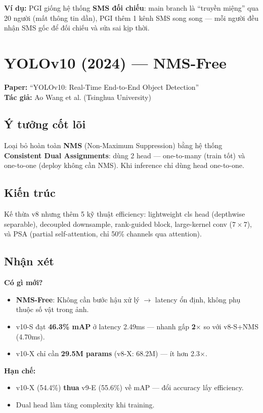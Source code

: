 \documentclass[12pt,a4paper]{report}
\begin{document}
\textbf{Ví dụ:} PGI giống hệ thống \textbf{SMS đối chiếu}: main branch là ``truyền miệng'' qua 20 người (mất thông tin dần), PGI thêm 1 kênh SMS song song --- mỗi người đều nhận SMS gốc để đối chiếu và sửa sai kịp thời.

\section{YOLOv10 (2024) --- NMS-Free}
\textbf{Paper:} ``YOLOv10: Real-Time End-to-End Object Detection''\\
\textbf{Tác giả:} Ao Wang et al. (Tsinghua University)

\subsection{Ý tưởng cốt lõi}
Loại bỏ hoàn toàn \textbf{NMS} (Non-Maximum Suppression) bằng hệ thống \textbf{Consistent Dual Assignments}: dùng 2 head --- one-to-many (train tốt) và one-to-one (deploy không cần NMS). Khi inference chỉ dùng head one-to-one.

\subsection{Kiến trúc}
Kế thừa v8 nhưng thêm 5 kỹ thuật efficiency: lightweight cls head (depthwise separable), decoupled downsample, rank-guided block, large-kernel conv ($7\times7$), và PSA (partial self-attention, chỉ 50\% channels qua attention).

\subsection{Nhận xét}

\textbf{Có gì mới?}
\begin{itemize}
    \item \textbf{NMS-Free}: Không cần bước hậu xử lý $\rightarrow$ latency ổn định, không phụ thuộc số vật trong ảnh.
    \item v10-S đạt \textbf{46.3\% mAP} ở latency 2.49ms --- nhanh gấp \textbf{2$\times$} so với v8-S+NMS (4.70ms).
    \item v10-X chỉ cần \textbf{29.5M params} (v8-X: 68.2M) --- ít hơn 2.3$\times$.
\end{itemize}

\textbf{Hạn chế:}
\begin{itemize}
    \item v10-X (54.4\%) \textbf{thua} v9-E (55.6\%) về mAP --- đổi accuracy lấy efficiency.
    \item Dual head làm tăng complexity khi training.
\end{itemize}
\end{document}
